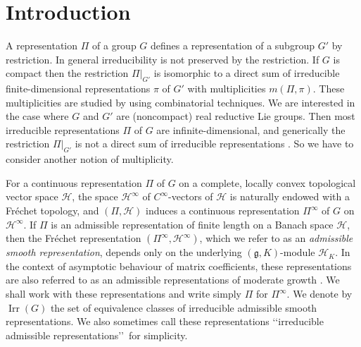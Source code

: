 \newpage
\section{Introduction}
\label{sec:Intro}


\newcommand{\bZ}{{\mathbb Z}}
\newcommand{\bR}{{\mathbb R}}
\newcommand{\bC}{{\mathbb C}}
\newcommand{\bN}{{\mathbb N}}

A representation $\Pi$ of a group $G$
 defines a representation
 of a subgroup $G'$
 by restriction.  
In general irreducibility 
 is not preserved by the restriction.  
If $G$ is compact
 then the restriction $\Pi|_{G'}$ is isomorphic
 to a direct sum of irreducible finite-dimensional representations $\pi$ of $G'$ with multiplicities  $m(\Pi,\pi)$. 
These multiplicities are studied by using combinatorial techniques.  
We are interested in the case
 where $G$ and $G'$ are (noncompact) real reductive Lie groups.  
Then most irreducible representations $\Pi$ of $G$ are
 infinite-dimensional, 
 and generically the restriction $\Pi|_{G'}$
 is not a direct sum of irreducible representations
 \cite{KInvent98}.  
So we have to consider another notion of multiplicity.




For a continuous representation $\Pi$ of $G$
 on a complete, 
 locally convex topological vector space ${\mathcal{H}}$,
 the space ${\mathcal{H}}^\infty $ of $C^\infty$-vectors of ${\mathcal{H}}$
 is naturally endowed with a Fr{\'e}chet topology,
 and $(\Pi,{\mathcal{H}})$ induces a continuous representation $\Pi^{\infty}$ of $G$
 on ${\mathcal{H}}^\infty$.  
If $\Pi$ is an admissible representation
 of finite length on a Banach space ${\mathcal{H}}$, 
 then the Fr{\'e}chet representation 
 $(\Pi^{\infty}, {\mathcal{H}}^{\infty})$, 
 which we refer to as an 
{\it{admissible smooth representation}}, 
 depends only 
 on the underlying $({\mathfrak {g}}, K)$-module
 ${\mathcal{H}}_K$.  
In the context of asymptotic behaviour 
 of matrix coefficients, 
 these representations
 are also referred to as an admissible representations
 of moderate growth \cite[Chap.~11]{W}.  
We shall work with these representations
 and write simply $\Pi$ for $\Pi^{\infty}$.  
We denote by 
${\operatorname{Irr}}(G)$
 the set of equivalence classes
 of irreducible admissible smooth representations.  
We also sometimes call these representations
 \lq\lq{irreducible admissible representations}\rq\rq\
 for simplicity.  

